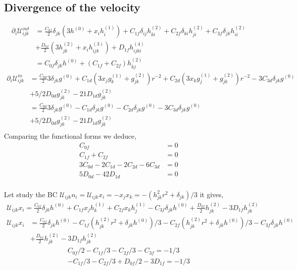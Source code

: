 \documentclass[12pt]{My_preprint}
\newcommand{\ii}{\delta}
\begin{document}
\subsection{Divergence of the velocity}
\begin{align}
    \partial_i \mathcal{U}_{ijk}^{out}
    &=
    \frac{C_{0f}}{2} \delta_{jk} ( 3   h^{(0)} + x_i   h^{(1)}_i )
    + C_{1f} \delta_{ij} h^{(2)}_{ki}
    + C_{2f} \delta_{ki} h^{(2)}_{ji}
    + C_{3f} \delta_{jk} h^{(2)}_{ii} \\
    &+ \frac{D_{0f}}{2}  (3 h^{(2)}_{jk} + x_i h^{(3)}_{ijk})
    + D_{1f} h^{(4)}_{ijki} \\
    &=
    C_{0f} \delta_{jk} h^{(0)} 
    + (C_{1f} + C_{2f})h^{(2)}_{kj}
\end{align}
\begin{align}
    \partial_i \mathcal{U}_{ijk}^{in}
    &=
    \frac{C_{0d}}{2} 3  \delta_{jk} g^{(0)} 
    + 
    C_{1d} (3 x_j g^{(1)}_k + g^{(2)}_{jk})r^{-2}
    + C_{2d} (3 x_k g^{(1)}_j + g^{(2)}_{jk}) r^{-2}
    - 3 C_{3d} \delta_{jk} g^{(0)} \\
    &+ 5/2 D_{0d}   g^{(2)}_{jk}
    -21 D_{1d}  g^{(2)}_{jk} \\
    &=
    \frac{C_{0d}}{2} 3  \delta_{jk} g^{(0)} 
    - C_{1d} \delta_{jk}g^{(0)}
    - C_{2d} \delta_{jk}g^{(0)}
    - 3 C_{3d} \delta_{jk} g^{(0)} \\
    &+ 5/2 D_{0d}   g^{(2)}_{jk}
    -21 D_{1d}  g^{(2)}_{jk} \\
\end{align}
Comparing the functional forms we deduce, 
\begin{align*}
    C_{0f} &= 0\\
    C_{1f} + C_{2f}&= 0  \\
    3C_{0d} - 2C_{1d}-2C_{2d} - 6 C_{3d} &=0 \\
    5 D_{0d} - 42 D_{1d} &= 0\\
\end{align*}


Let study the BC $\mathcal{U}_{ijk} n_i = \mathcal{U}_{ijk} x_i = - x_jx_k = - (h^2_{jk}r^2 + \ii_{jk})/3$ it gives,  
\begin{align}
    \mathcal{U}_{ijk} x_i
    =
    \frac{C_{0f}}{2}\delta_{jk} h^{(0)} 
    + 
    C_{1f} x_j h^{(1)}_k
    + C_{2f} x_k h^{(1)}_j
    - C_{3f} \delta_{jk} h^{(0)}
    + \frac{D_{0f}}{2} h^{(2)}_{jk}
    -3  D_{1f} h^{(2)}_{jk}
\end{align}
\begin{align}
    \mathcal{U}_{ijk} x_i
    &=
    \frac{C_{0f}}{2}\delta_{jk} h^{(0)} 
    - C_{1f} (h^{(2)}_{jk} r^2 + \ii_{jk}h^{(0)})/3
    - C_{2f} (h^{(2)}_{jk} r^2 + \ii_{jk}h^{(0)})/3
    - C_{3f} \ii_{jk} h^{(0)}\\
    &+ \frac{D_{0f}}{2} h^{(2)}_{jk}
    -3  D_{1f} h^{(2)}_{jk}
\end{align}
\begin{align}
    C_{0f}/2-C_{1f}/3-C_{2f}/3-C_{3f} = -1/3\\
    -C_{1f}/3-C_{2f}/3 + D_{0f}/2 - 3D_{1f} = -1/3\\
\end{align}
\end{document}
